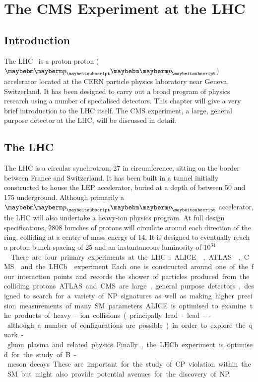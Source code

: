 \chapter{The \acl{CMS} Experiment at the \acl{LHC}}
\label{sec:experiment}
\section{Introduction}
The \acf{LHC}~\cite{lhc_design_report} is a proton-proton ($\Pp\Pp$) accelerator
located at the CERN particle physics laboratory near Geneva, Switzerland. It has
been designed to carry out a broad program of physics research using a number of
specialised detectors. This chapter will give a very brief introduction to the
\ac{LHC} itself. The \acf{CMS} experiment, a large, general purpose detector at
the \ac{LHC}, will be discussed in detail.

\section{The \acl{LHC}}
The \ac{LHC} is a circular synchrotron, \unit{27}{\kilo\metre} in circumference,
sitting on the border between France and Switzerland. It has been built in a
tunnel initially constructed to house the \ac{LEP} accelerator, buried at a
depth of between 50 and \unit{175}{\metre} underground. Although primarily a
$\Pp\Pp$ accelerator, the \ac{LHC} will also undertake a heavy-ion physics
program. At full design specifications, 2808 bunches of protons will circulate
around each direction of the ring, colliding at a centre-of-mass energy of
\unit{14}{\TeV}. It is designed to eventually reach a proton bunch spacing of
\unit{25}{\ns} and an instantaneous luminosity of
\unit{$10^{34}$}{\rpsquare{\centi\metre}\usk\reciprocal\second}.

There are four primary experiments at the \ac{LHC}:
\ac{ALICE}~\cite{alice_proposal}, \ac{ATLAS}~\cite{atlas_proposal},
\ac{CMS}~\cite{cms_technical_proposal,cms_jinst} and the
\ac{LHCb}~\cite{lhcb_proposal} experiment. Each one is constructed around one of
the four interaction points and records the shower of particles produced from
the colliding protons. \ac{ATLAS} and \ac{CMS} are large, general purpose
detectors, designed to search for a variety of \ac{NP} signatures as well as
making higher precision measurements of many \ac{SM} parameters. \ac{ALICE} is
optimised to examine the products of heavy-ion collisions (principally lead-lead
-- although a number of configurations are possible) in order to explore the
quark-gluon plasma and related physics. Finally, the \ac{LHCb} experiment is
optimised for the study of B-meson decays. These are important for the study of
CP violation within the \ac{SM} but might also provide potential avenues for the
discovery of \ac{NP}.

